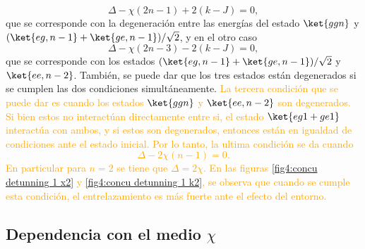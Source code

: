 \begin{equation}
    \Delta-\chi(2n-1)+2(k-J)=0,
    \label{ec4:condicion 1}
\end{equation}
que se corresponde con la degeneración entre las energías del estado $\ket{ggn}$ y $(\ket{eg,n-1}+\ket{ge,n-1})/\sqrt{2}$, y en el otro caso
\begin{equation}
    \Delta-\chi(2n-3)-2(k-J)=0,
    \label{ec4:condicion 2}
\end{equation}
que se corresponde con los estados $(\ket{eg,n-1}+\ket{ge,n-1})/\sqrt{2}$ y $\ket{ee,n-2}$. También, se puede dar que los tres estados están degenerados si se cumplen las dos condiciones simultáneamente.
\textcolor{orange}{
La tercera condición que se puede dar es cuando los estados $\ket{ggn}$ y $\ket{ee,n-2}$ son degenerados. Si bien estos no interactúan directamente entre si, el estado $\ket{eg1+ge1}$ interactúa con ambos, y si estos son degenerados, entonces están en igualdad de condiciones ante el estado inicial. Por lo tanto, la ultima condición se da cuando
\begin{equation}
    \Delta-2\chi(n-1)=0.
    \label{ec4:condicion 3}
\end{equation}
En particular para $n=2$ se tiene que $\Delta=2\chi$. En las figuras \ref{fig4:concu detunning 1 x2} y \ref{fig4:concu detunning 1 k2}, se observa que cuando se cumple esta condición, el entrelazamiento es más fuerte ante el efecto del entorno.  
}

\subsection{Dependencia con el medio $\chi$}
